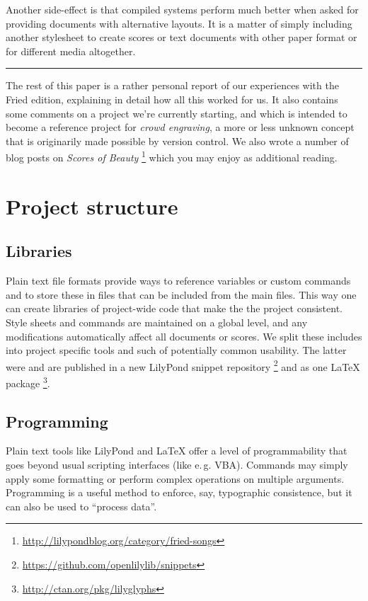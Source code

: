 \documentclass[11pt,a4paper]{article}
\begin{document}
Another side-effect is that compiled systems perform much better when asked for providing
documents with alternative layouts. It is a matter of simply including another stylesheet
to create scores or text documents with other paper format or for different media altogether.

\bigskip
\hrule

\bigskip
The rest of this paper is a rather personal report of our experiences with the Fried
edition, explaining in detail how all this worked for us.  It also contains
some comments on a project we're currently starting, and which is intended to become
a reference project for \emph{crowd engraving}, a more or less unknown concept that is
originarily made possible by version control. We also wrote a number of blog posts on
\emph{Scores of Beauty}%
\footnote{\url{http://lilypondblog.org/category/fried-songs}}
which you may enjoy as additional reading.


\section{Project structure}

\subsection{Libraries}
Plain text file formats provide ways to reference variables or custom
commands and to store these in files that can be included from the
main files. This way one can create libraries of project-wide code
that make the the project consistent. Style sheets and commands are
maintained on a global level, and any modifications automatically
affect all documents or scores.
We split these includes into project specific tools and such of potentially
common usability. The latter were and are published in a new LilyPond snippet
repository%
\footnote{\url{https://github.com/openlilylib/snippets}}
and as one \LaTeX{} package%
\footnote{\url{http://ctan.org/pkg/lilyglyphs}}.

\subsection{Programming}
Plain text tools like LilyPond and \LaTeX{} offer a level of programmability that
goes beyond usual scripting interfaces (like e.\,g. VBA). Commands may simply apply
some formatting or perform complex operations on multiple arguments.
Programming is a useful method to enforce, say, typographic consistence, but it can
also be used to “process data”.
\end{document}
